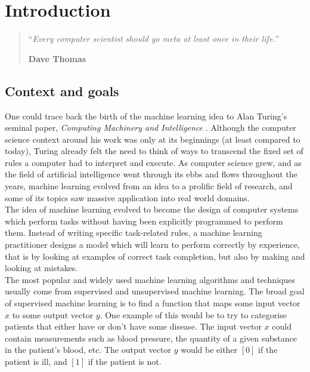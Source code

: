 \chapter{Introduction}
\setcounter{page}{1}
\begin{quotation}
\noindent ``\emph{Every computer scientist should go meta at least once in
	their life.}''
\begin{flushright}\textbf{Dave Thomas}\end{flushright}
\end{quotation}

\vspace*{0.5cm}

\section{Context and goals}
One could trace back the birth of the machine learning idea to Alan Turing's 
seminal paper, \textit{Computing Machinery and Intelligence} 
\cite{turing1950computing}. Although the computer science context around his
work was only at its beginnings (at least compared to today), Turing already felt
the need to think of ways to transcend the fixed set of rules a computer had
to interpret and execute. As computer science grew, and as the field of
artificial intelligence went through its ebbs and flows throughout the years,
machine learning evolved from an idea to a prolific field of research, and
some of its topics saw massive application into real world domains.\\

The idea of machine learning evolved to become the design of computer systems
which perform tasks without having been explicitly programmed to perform them.
Instead of writing specific task-related rules, a machine learning practitioner
designs a model which will learn to perform correctly by experience, that is by
looking at examples of correct task completion, but also by making and looking
at mistakes.\\

The most popular and widely used machine learning algorithms and techniques
usually come from supervised and unsupervised machine learning.
The broad goal of supervised machine learning is to find a function that maps
some input vector $x$ to some output vector $y$. One example of this would be
to try to categorise patients that either have or don't have some disease. 
The input vector $x$ could contain measurements such as blood pressure, the 
quantity of a given substance in the patient's blood, etc. The output vector
$y$ would be either $[0]$ if the patient is ill, and $[1]$ if the patient is
not.\\

